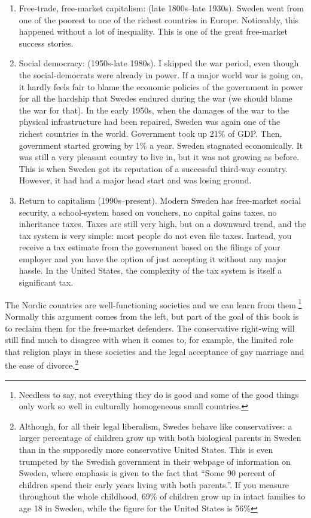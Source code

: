 \begin{enumerate}
\item Free-trade, free-market capitalism: (late 1800s--late 1930s). Sweden went
from one of the poorest to one of the richest countries in Europe. Noticeably,
this happened without a lot of inequality. This is one of the great free-market
success stories.
\item Social democracy: (1950s-late 1980s). I skipped the war period, even
though the social-democrats were already in power. If a major world war is
going on, it hardly feels fair to blame the economic policies of the government
in power for all the hardship that Swedes endured during the war (we should
blame the war for that). In the early 1950s, when the damages of the war to the
physical infrastructure had been repaired, Sweden was again one of the richest
countries in the world. Government took up 21\% of GDP. Then, government
started growing by 1\% a year. Sweden stagnated economically.  It was still a
very pleasant country to live in,  but it was not growing as before. This is
when Sweden got its reputation of a successful third-way country. However, it
had had a major head start and was losing ground.
\item Return to capitalism (1990s--present). Modern Sweden has free-market
social security, a school-system based on vouchers, no capital gains taxes, no
inheritance taxes. Taxes are still very high, but on a downward trend, and the
tax system is very simple: most people do not even file taxes. Instead, you
receive a tax estimate from the government based on the filings of your
employer and you have the option of just accepting it without any major hassle.
In the United States, the complexity of the tax system is itself a significant
tax.
\end{enumerate}

The Nordic countries are well-functioning societies and we can learn from
them.\footnote{Needless to say, not everything they do is good and some of the
good things only work so well in culturally homogeneous small countries.}
Normally this argument comes from the left, but part of the goal of this book
is to reclaim them for the free-market defenders. The conservative right-wing
will still find much to disagree with when it comes to, for example, the
limited role that religion plays in these societies and the legal acceptance of
gay marriage and the ease of divorce.\footnote{Although, for all their legal
liberalism, Swedes behave like conservatives: a larger percentage of children
grow up with both biological parents in Sweden than in the supposedly more
conservative United States. This is even trumpeted by the Swedish government in
their webpage of information on Sweden, where emphasis is given to the fact
that ``Some 90 percent of children spend their early years living with both
parents.''.
If you measure throughout the whole childhood, 69\% of children grow up in
intact families to age 18 in Sweden, while the figure for the United States is
56\%}

